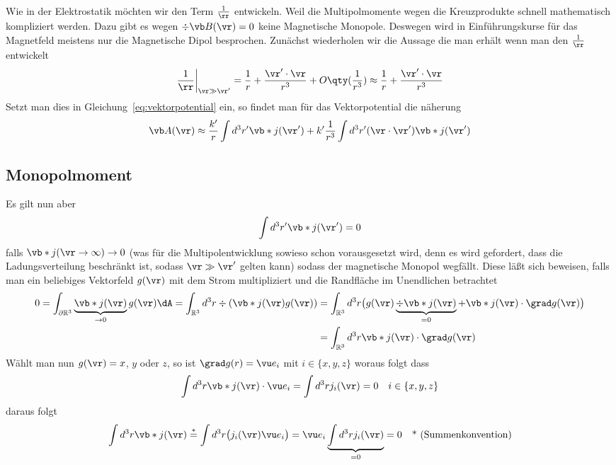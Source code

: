 Wie in der Elektrostatik möchten wir den Term $\frac{1}{\rr}$ entwickeln. Weil
die Multipolmomente wegen die Kreuzprodukte schnell mathematisch kompliziert werden. Dazu gibt es wegen $\div \vb B(\vr)=0$ keine Magnetische Monopole. Deswegen wird in Einführungskurse für das Magnetfeld meistens nur die Magnetische Dipol besprochen.
Zunächst wiederholen wir die Aussage die man erhält wenn man den $\frac{1}{\rr}$ entwickelt
\begin{equation}
  \frac{1}{\rr}\bigg|_{\vr\gg\vr'} = \frac{1}{r} + \frac{\vr'\cdot\vr}{r^3}
  + O\qty(\frac{1}{r^3})\approx \frac{1}{r} + \frac{\vr'\cdot\vr}{r^3} 
\end{equation}
Setzt man dies in Gleichung~\ref{eq:vektorpotential} ein, so findet man für
das Vektorpotential die näherung
\begin{equation}
  \label{eq:mag-multipol}
  \vb A(\vr) \approx \frac{k'}{r}\int d^3r'\vb*j(\vr') +
  k' \frac{1}{r^3}\int d^3r' (\vr\cdot\vr') \vb*j(\vr')
\end{equation}

\subsection{Monopolmoment}%
\label{sub:Monopolmoment}
Es gilt nun aber
\begin{equation*}
  \int d^3r'\vb*j(\vr')=0
\end{equation*}
falls $\vb*j(\vr\to\infty)\to0$ (was für die Multipolentwicklung sowieso schon vorausgesetzt wird, denn es wird gefordert, dass die Ladungsverteilung beschränkt ist, sodass $\vr\gg\vr'$ gelten kann) sodass der magnetische Monopol wegfällt.
Diese läßt sich beweisen, falls man ein beliebiges Vektorfeld $g(\vr)$ mit
dem Strom multipliziert und die Randfläche im Unendlichen betrachtet
\begin{equation}
  \label{eq:stromintegral-identitaet}
  \begin{split}
    0=\int_{\partial\mathbb{R}^3} \underbrace{\vb*j(\vr)}_{\to0}g(\vr)\dA 
    =\int_{\mathbb{R}^3}d^3r\div(\vb*j(\vr)g(\vr))
    &=\int_{\mathbb{R}^3}d^3r\big(g(\vr)\underbrace{\div\vb*j(\vr)}_{=0} + \vb*j(\vr)\cdot\grad g(\vr)\big)\\
    &=\int_{\mathbb{R}^3}d^3r \vb*j(\vr)\cdot\grad g(\vr)
  \end{split}
\end{equation}
Wählt man nun $g(\vr)=x$, $y$ oder $z$, so ist $\grad g(r)=\vu e_i$ mit $i\in\{x,y,z\}$
woraus folgt dass
\begin{equation}
  \int d^3r \vb*j(\vr)\cdot\vu e_i =\int d^3r j_i(\vr)= 0 \quad i\in\{x,y,z\}
\end{equation}
daraus folgt 
\begin{equation}
  \int d^3r\vb*j(\vr) 
  \stackrel{*}{=} \int d^3r\big(j_i(\vr)\vu e_i\big)
  = \vu e_i \underbrace{\int d^3rj_i(\vr)}_{=0}
  =0
  \quad
  \text{* (Summenkonvention)}
\end{equation}
